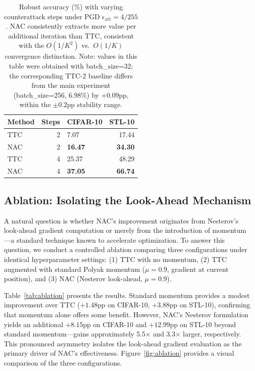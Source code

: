 \documentclass[12pt,a4paper]{article}
\begin{document}
\begin{table}[ht]\centering\small
\caption{Robust accuracy (\%) with varying counterattack steps under PGD $\epsilon_{\text{att}}=4/255$. NAC consistently extracts more value per additional iteration than TTC, consistent with the $O(1/K^2)$ vs.\ $O(1/K)$ convergence distinction. Note: values in this table were obtained with batch\_size=32; the corresponding TTC-2 baseline differs from the main experiment (batch\_size=256, $6.98\%$) by $+0.09$pp, within the $\pm 0.2$pp stability range.}\label{tab:nstep}
\begin{tabular}{@{}lrlr@{}}
\toprule Method & Steps & CIFAR-10 & STL-10 \\
\midrule TTC & 2 & 7.07 & 17.44 \\
NAC & 2 & \textbf{16.47} & \textbf{34.30} \\
TTC & 4 & 25.37 & 48.29 \\
NAC & 4 & \textbf{37.05} & \textbf{66.74} \\
\bottomrule
\end{tabular}
\end{table}

\subsection{Ablation: Isolating the Look-Ahead Mechanism}\label{sec:ablation}

A natural question is whether NAC's improvement originates from Nesterov's look-ahead gradient computation or merely from the introduction of momentum---a standard technique known to accelerate optimization. To answer this question, we conduct a controlled ablation comparing three configurations under identical hyperparameter settings: (1) TTC with no momentum, (2) TTC augmented with standard Polyak momentum ($\mu=0.9$, gradient at current position), and (3) NAC (Nesterov look-ahead, $\mu=0.9$).

Table~\ref{tab:ablation} presents the results. Standard momentum provides a modest improvement over TTC ($+1.48$pp on CIFAR-10, $+3.88$pp on STL-10), confirming that momentum alone offers some benefit. However, NAC's Nesterov formulation yields an additional $+8.15$pp on CIFAR-10 and $+12.99$pp on STL-10 beyond standard momentum---gains approximately 5.5$\times$ and 3.3$\times$ larger, respectively. This pronounced asymmetry isolates the look-ahead gradient evaluation as the primary driver of NAC's effectiveness. Figure~\ref{fig:ablation} provides a visual comparison of the three configurations.
\end{document}
